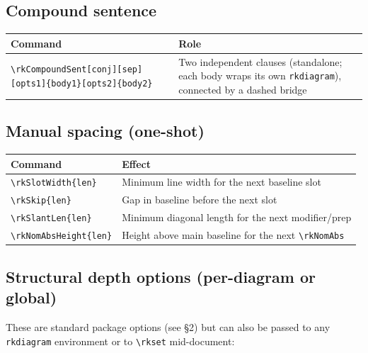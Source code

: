 \documentclass[11pt]{article}
\newcommand{\cmd}[1]{\texttt{\textbackslash #1}}
\begin{document}
\subsection*{Compound sentence}

\medskip
\begin{tabular}{@{}p{7cm}p{8cm}@{}}
  \toprule
  Command & Role \\
  \midrule
  \cmd{rkCompoundSent[conj][sep][opts1]\{body1\}[opts2]\{body2\}} &
    Two independent clauses (standalone; each body wraps its own \texttt{rkdiagram}), connected by a dashed bridge \\
  \bottomrule
\end{tabular}

\subsection*{Manual spacing (one-shot)}

\medskip
\begin{tabular}{@{}p{7cm}p{8cm}@{}}
  \toprule
  Command & Effect \\
  \midrule
  \cmd{rkSlotWidth\{len\}}     & Minimum line width for the next baseline slot \\
  \cmd{rkSkip\{len\}}          & Gap in baseline before the next slot \\
  \cmd{rkSlantLen\{len\}}      & Minimum diagonal length for the next modifier/prep \\
  \cmd{rkNomAbsHeight\{len\}}  & Height above main baseline for the next \cmd{rkNomAbs} \\
  \bottomrule
\end{tabular}

\subsection*{Structural depth options (per-diagram or global)}

These are standard package options (see §2) but can also be passed to any \texttt{rkdiagram} environment or to \cmd{rkset} mid-document:
\end{document}
